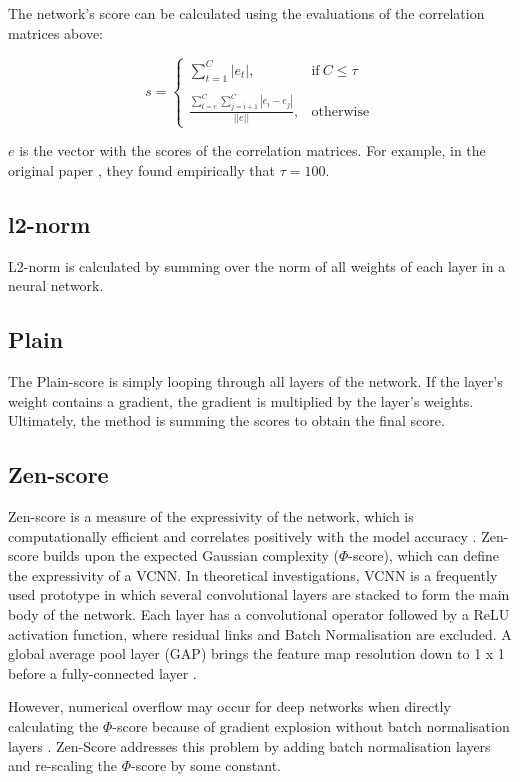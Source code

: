 The network's score can be calculated using the evaluations of the correlation matrices above: 

\begin{equation}
    s = 
    \begin{cases}
        \sum_{t=1}^C |e_t|, & \text{if}\ C \leq \tau \\ \\ 
        \frac{\sum_{t=e}^C \sum_{j=i+1}^C |e_i - e_j|}{||e||}, & \text{otherwise}
    \end{cases}
\end{equation}

$e$ is the vector with the scores of the correlation matrices. For example, in the original paper \autocite{lopes2021epe}, they found empirically that $\tau = 100$. 

\subsection{l2-norm}
L2-norm is calculated by summing over the norm of all weights of each layer in a neural network. 

\subsection{Plain}
The Plain-score is simply looping through all layers of the network. If the layer's weight contains a gradient, the gradient is multiplied by the layer's weights. Ultimately, the method is summing the scores to obtain the final score. 

\subsection{Zen-score}
Zen-score is a measure of the expressivity of the network, which is computationally efficient and correlates positively with the model accuracy \autocite{lin2021zen}. Zen-score builds upon the expected Gaussian complexity ($\Phi$-score), which can define the expressivity of a \Gls{VCNN}. In theoretical investigations, \gls{VCNN} is a frequently used prototype in which several convolutional layers are stacked to form the main body of the network. Each layer has a convolutional operator followed by a ReLU activation function, where residual links and Batch Normalisation are excluded. A global average pool layer (GAP) brings the feature map resolution down to 1 x 1 before a fully-connected layer  \autocite{lin2021zen}.  

However, numerical overflow may occur for deep networks when directly calculating the $\Phi$-score because of gradient explosion without batch normalisation layers \autocite{lin2021zen}. Zen-Score addresses this problem by adding batch normalisation layers and re-scaling the $\Phi$-score by some constant. 

